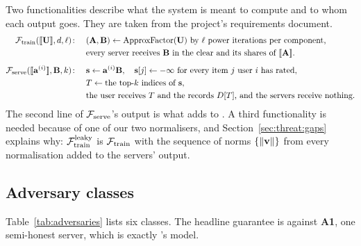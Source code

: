 Two functionalities describe what the system is meant to compute and to whom
each output goes. They are taken from the project's requirements document.
%
\begin{align*}
  \mathcal{F}_{\mathrm{train}}(\llbracket \mathbf{U} \rrbracket, d, \ell)\colon\quad
    & (\mathbf{A}, \mathbf{B}) \gets \operatorname{ApproxFactor}(\mathbf{U}) \text{ by $\ell$
      power iterations per component,}\\
    & \text{every server receives $\mathbf{B}$ in the clear and its shares of
      $\llbracket \mathbf{A} \rrbracket$.}\\[4pt]
  \mathcal{F}_{\mathrm{serve}}(\llbracket \mathbf{a}^{(i)} \rrbracket, \mathbf{B}, k)\colon\quad
    & \mathbf{s} \gets \mathbf{a}^{(i)}\mathbf{B}, \quad
      \mathbf{s}[j] \gets -\infty \text{ for every item $j$ user $i$ has
      rated},\\
    & T \gets \text{the top-$k$ indices of } \mathbf{s},\\
    & \text{the user receives $T$ and the records $D[T]$, and the servers
      receive nothing.}
\end{align*}
%
The second line of $\mathcal{F}_{\mathrm{serve}}$'s output is what \sys{} adds to \nudgeplain{}. A
third functionality is needed because of one of our two normalisers, and
Section~\ref{sec:threat:gaps} explains why: $\mathcal{F}_{\mathrm{train}}^{\mathrm{leaky}}$ is $\mathcal{F}_{\mathrm{train}}$ with the
sequence of norms $\{\left\lVert\mathbf{v}\right\rVert\}$ from every normalisation added to the
servers' output.

\subsection{Adversary classes}
\label{sec:threat:classes}

Table~\ref{tab:adversaries} lists six classes. The headline guarantee is against
\textbf{A1}, one semi-honest server, which is exactly \nudgeplain{}'s model.

